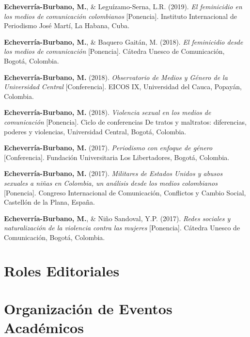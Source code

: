 \documentclass[11pt,a4paper,]{awesome-cv}
\begin{document}
\textbf{Echeverría-Burbano, M.}, \& Leguízamo-Serna, L.R. (2019).
\emph{El feminicidio en los medios de comunicación colombianos}
{[}Ponencia{]}. Instituto Internacional de Periodismo José Martí, La
Habana, Cuba.

\textbf{Echeverría-Burbano, M.}, \& Baquero Gaitán, M. (2018). \emph{El
feminicidio desde los medios de comunicación} {[}Ponencia{]}. Cátedra
Unesco de Comunicación, Bogotá, Colombia.

\textbf{Echeverría-Burbano, M.} (2018). \emph{Observatorio de Medios y
Género de la Universidad Central} {[}Conferencia{]}. EICOS IX,
Universidad del Cauca, Popayán, Colombia.

\textbf{Echeverría-Burbano, M.} (2018). \emph{Violencia sexual en los
medios de comunicación} {[}Ponencia{]}. Ciclo de conferencias De tratos
y maltratos: diferencias, poderes y violencias, Universidad Central,
Bogotá, Colombia.

\textbf{Echeverría-Burbano, M.} (2017). \emph{Periodismo con enfoque de
género} {[}Conferencia{]}. Fundación Universitaria Los Libertadores,
Bogotá, Colombia.

\textbf{Echeverría-Burbano, M.} (2017). \emph{Militares de Estados
Unidos y abusos sexuales a niñas en Colombia, un análisis desde los
medios colombianos} {[}Ponencia{]}. Congreso Internacional de
Comunicación, Conflictos y Cambio Social, Castellón de la Plana, España.

\textbf{Echeverría-Burbano, M.}, \& Niño Sandoval, Y.P. (2017).
\emph{Redes sociales y naturalización de la violencia contra las
mujeres} {[}Ponencia{]}. Cátedra Unesco de Comunicación, Bogotá,
Colombia.

\endgroup

\hypertarget{roles-editoriales}{%
\section{Roles Editoriales}\label{roles-editoriales}}

\begin{cventries}
\end{cventries}

\hypertarget{organizaciuxf3n-de-eventos-acaduxe9micos}{%
\section{Organización de Eventos
Académicos}\label{organizaciuxf3n-de-eventos-acaduxe9micos}}
\end{document}
